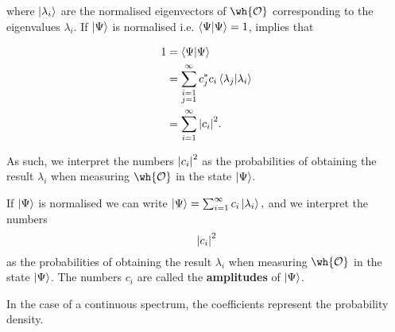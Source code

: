 \documentclass[12pt, a4paper]{article}
\begin{document}
where \(\ket{\lambda_i}\) are the normalised eigenvectors of \(\wh{\mathcal{O}}\) corresponding to the eigenvalues \(\lambda_i\). If \(\ket{\Psi}\) is normalised i.e. \(\bra{\Psi} \ket{\Psi} =1\), implies that 

\[\begin{aligned}
    1 &= \bra{\Psi} \ket{\Psi} \\
    &= \sum_{\substack{i=1 \\ j = 1}}^{\infty} c^*_j c_i \bra{\lambda_j} \ket{\lambda_i} \\
    &= \sum_{i=1}^{\infty} \abs{c_i}^2.
\end{aligned}\]

As such, we interpret the numbers \(\abs{c_i}^2\) as the probabilities of obtaining the result \(\lambda_i\) when measuring \(\wh{\mathcal{O}}\) in the state \(\ket{\Psi}\).

\begin{mdthm}
    If \(\ket{\Psi}\) is normalised we can write \(\ket{\Psi} = \sum_{i=1}^{\infty} c_i \ket{\lambda_i},\)
    and we interpret the numbers 
    \[\abs{c_i}^2\]
    as the probabilities of obtaining the result \(\lambda_i\) when measuring \(\wh{\mathcal{O}}\) in the state \(\ket{\Psi}\). The numbers \(c_i\) are called the \textbf{amplitudes} of \(\ket{\Psi}\).
\end{mdthm}

\begin{mdthm}
    In the case of a continuous spectrum, the coefficients represent the probability density.
\end{mdthm}
\end{document}
